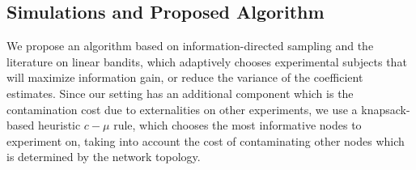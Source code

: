 \documentclass[11pt,a4paper]{article}
\begin{document}
\subsection{Simulations and Proposed Algorithm}

We propose an algorithm based on information-directed sampling and the literature on linear bandits, which adaptively chooses experimental subjects that will maximize information gain, or reduce the variance of the coefficient estimates. Since our setting has an additional component which is the contamination cost due to externalities on other experiments, we use a knapsack-based heuristic $c-\mu$ rule, which chooses the most informative nodes to experiment on, taking into account the cost of contaminating other nodes which is determined by the network topology.

%
%
%
%
%
%
%
%
%
%
%
%
%




\end{document}
